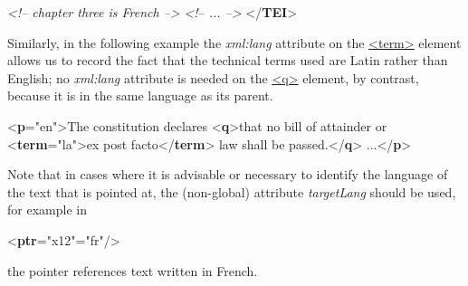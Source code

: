 \begin{shaded}
\hspace*{1em}\hspace*{1em}\mbox{}\newline 
\textit{<!-- chapter three is French -->}\mbox{}\newline 
\hspace*{1em}\hspace*{1em}\mbox{}\newline 
\textit{<!-- ... -->}\mbox{}\newline 
\hspace*{1em}\mbox{}\newline 
{}\mbox{}\newline 
{</\textbf{TEI}>}\end{shaded}\egroup\par \par
Similarly, in the following example the {\itshape xml:lang} attribute on the \hyperref[TEI.term]{<term>} element allows us to record the fact that the technical terms used are Latin rather than English; no {\itshape xml:lang} attribute is needed on the \hyperref[TEI.q]{<q>} element, by contrast, because it is in the same language as its parent. \par\bgroup{}\exampleFont \begin{shaded}\noindent\mbox{}{<\textbf{p}\hspace*{1em}{xml:lang}="{en}">}The\mbox{}\newline 
 constitution declares {<\textbf{q}>}that no bill of attainder or {<\textbf{term}\hspace*{1em}{xml:lang}="{la}">}ex post\mbox{}\newline 
\hspace*{1em}\hspace*{1em}\hspace*{1em}\hspace*{1em} facto{</\textbf{term}>} law shall be passed.{</\textbf{q}>} ...{</\textbf{p}>}\end{shaded}\egroup\par \par
Note that in cases where it is advisable or necessary to identify the language of the text that is pointed at, the (non-global) attribute {\itshape targetLang} should be used, for example in \par\bgroup{}\exampleFont \begin{shaded}\noindent\mbox{}{<\textbf{ptr}\hspace*{1em}{target}="{x12}"\hspace*{1em}{targetLang}="{fr}"/>}\end{shaded}\egroup\par \noindent  the pointer references text written in French.\par
